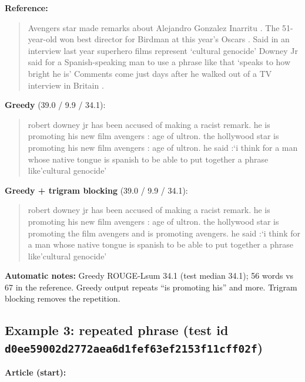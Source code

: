 \documentclass[10pt,a4paper]{article}
\begin{document}
\textbf{Reference:}

\begin{quote}
Avengers star made remarks about Alejandro Gonzalez Inarritu .
The 51-year-old won best director for Birdman at this year's Oscars .
Said in an interview last year superhero films represent `cultural genocide'
Downey Jr said for a Spanish-speaking man to use a phrase like that `speaks to how bright he is'
Comments come just days after he walked out of a TV interview in Britain .
\end{quote}

\textbf{Greedy} (39.0 / 9.9 / 34.1):

\begin{quote}
robert downey jr has been accused of making a racist remark.
he is promoting his new film avengers : age of ultron.
the hollywood star is promoting his new film avengers : age of ultron.
he said :`i think for a man whose native tongue is spanish to be able to put together a phrase like'cultural genocide'
\end{quote}

\textbf{Greedy + trigram blocking} (39.0 / 9.9 / 34.1):

\begin{quote}
robert downey jr has been accused of making a racist remark.
he is promoting his new film avengers : age of ultron.
the hollywood star is promoting the film avengers and is promoting avengers.
he said :`i think for a man whose native tongue is spanish to be able to put together a phrase like'cultural genocide'
\end{quote}

\textbf{Automatic notes:} Greedy ROUGE-Lsum 34.1 (test median 34.1); 56 words vs 67 in the reference. Greedy output repeats ``is promoting his'' and more. Trigram blocking removes the repetition.

\hypertarget{example-3-repeated-phrase-test-id-d0ee59002d2772aea6d1fef63ef2153f11cff02f}{%
\subsection{\texorpdfstring{Example 3: repeated phrase (test id \texttt{d0ee59002d2772aea6d1fef63ef2153f11cff02f})}{Example 3: repeated phrase (test id d0ee59002d2772aea6d1fef63ef2153f11cff02f)}}\label{example-3-repeated-phrase-test-id-d0ee59002d2772aea6d1fef63ef2153f11cff02f}}

\textbf{Article (start):}
\end{document}
